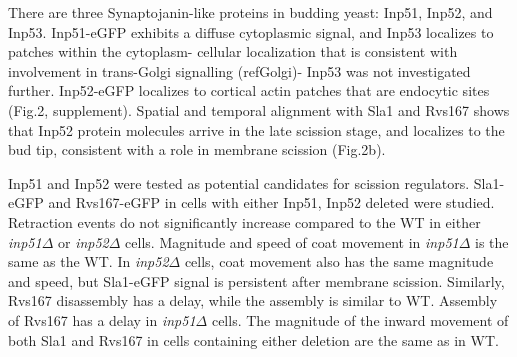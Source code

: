 \documentclass[9pt,lineno]{elife}
\begin{document}


There are three Synaptojanin-like proteins in budding yeast: Inp51, Inp52, and Inp53. Inp51-eGFP exhibits a diffuse cytoplasmic signal, and Inp53 localizes to patches within the cytoplasm- cellular localization that is consistent with involvement in trans-Golgi signalling (refGolgi)- Inp53 was not investigated further. Inp52-eGFP localizes to cortical actin patches that are endocytic sites (Fig.2, supplement). Spatial and temporal alignment with Sla1 and Rvs167 shows that Inp52 protein molecules arrive in the late scission stage, and localizes to the bud tip, consistent with a role in membrane scission (Fig.2b). 

Inp51 and Inp52 were tested as potential candidates for scission regulators. Sla1-eGFP and Rvs167-eGFP in cells with either Inp51, Inp52 deleted were studied. Retraction events do not significantly increase compared to the WT in either \textit{inp51$\Delta$} or \textit{inp52$\Delta$} cells. Magnitude and speed of coat movement in  \textit{inp51$\Delta$} is the same as the WT. In  \textit{inp52$\Delta$} cells, coat movement also has the same magnitude and speed, but Sla1-eGFP signal is persistent after membrane scission. Similarly, Rvs167 disassembly has a delay, while the assembly is similar to WT. Assembly of Rvs167 has a delay in \textit{inp51$\Delta$} cells. The magnitude of the inward movement of both Sla1 and Rvs167 in cells containing either deletion are the same as in WT. 


\end{document}
